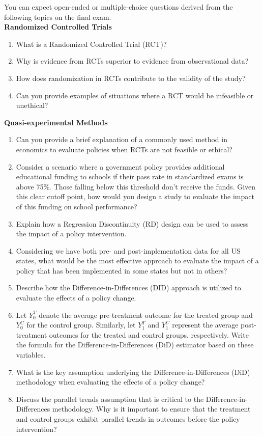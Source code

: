 \documentclass{./../../Latex/handout}
\begin{document}
\thispagestyle{plain}
\vspace{-1em}

You can expect open-ended or multiple-choice questions derived from the following topics on the final exam. \\

\textbf{Randomized Controlled Trials} \vspace{-1em}
\begin{enumerate}
\item What is a Randomized Controlled Trial (RCT)?
\item Why is evidence from RCTs superior to evidence from observational data?
\item How does randomization in RCTs contribute to the validity of the study?
\item Can you provide examples of situations where a RCT would be infeasible or unethical?
\end{enumerate}

\textbf{Quasi-experimental Methods} \vspace{-1em}
\begin{enumerate}
\item Can you provide a brief explanation of a commonly used method in
economics to evaluate policies when RCTs are not
feasible or ethical?
\item Consider a scenario where a government policy provides additional educational funding to schools if their pass rate in standardized exams is above 75\%. Those falling below this threshold don't receive the funds. Given this clear cutoff point, how would you design a study to evaluate the impact of this funding on school performance?
\item Explain how a Regression Discontinuity (RD) design can be used to assess the impact of a policy intervention. 
\item Considering we have both pre- and post-implementation data for all US states, what would be the most effective approach to evaluate the impact of a policy that has been implemented in some states but not in others?
\item Describe how the Difference-in-Differences (DID) approach is utilized to evaluate the effects of a policy change. 
\item Let \( Y^T_0 \) denote the average pre-treatment outcome for the treated group and \( Y^C_0 \) for the control group. Similarly, let \( Y^T_1 \) and \( Y^C_1 \) represent the average post-treatment outcomes for the treated and control groups, respectively. Write the formula for the Difference-in-Differences (DiD) estimator based on these variables.
\item What is the key assumption underlying the Difference-in-Differences (DiD) methodology when evaluating the effects of a policy change?
\item Discuss the parallel trends assumption that is critical to the Difference-in-Differences methodology. Why is it important to ensure that the treatment and control groups exhibit parallel trends in outcomes before the policy intervention?
\end{enumerate}
\end{document}
